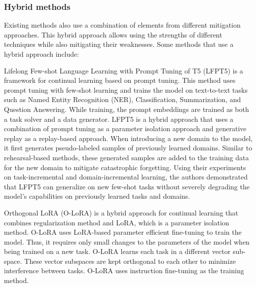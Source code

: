 \subsubsection{Hybrid methods}
Existing methods also use a combination of elements from different mitigation approaches. This hybrid approach allows using the strengths of different techniques while also mitigating their weaknesses. Some methods that use a hybrid approach include:

Lifelong Few-shot Language Learning with Prompt Tuning of T5 (LFPT5) \cite{qin2021lfpt5} is a framework for continual learning based on prompt tuning. This method uses prompt tuning with few-shot learning and trains the model on text-to-text tasks such as Named Entity Recognition (NER), Classification, Summarization, and Question Answering. While training, the prompt embeddings are trained as both a task solver and a data generator. LFPT5 is a hybrid approach that uses a combination of prompt tuning as a parameter isolation approach and generative replay as a replay-based approach. When introducing a new domain to the model, it first generates pseudo-labeled samples of previously learned domains. Similar to rehearsal-based methods, these generated samples are added to the training data for the new domain to mitigate catastrophic forgetting. Using their experiments on task-incremental and domain-incremental learning, the authors demonstrated that LFPT5 can generalize on new few-shot tasks without severely degrading the model’s capabilities on previously learned tasks and domains. 

Orthogonal LoRA (O-LoRA) \cite{wang2023orthogonal} is a hybrid approach for continual learning that combines regularization method and LoRA, which is a parameter isolation method. O-LoRA uses LoRA-based parameter efficient fine-tuning to train the model. Thus, it requires only small changes to the parameters of the model when being trained on a new task. O-LoRA learns each task in a different vector sub-space. These vector subspaces are kept orthogonal to each other to minimize interference between tasks. O-LoRA uses instruction fine-tuning as the training method. 

